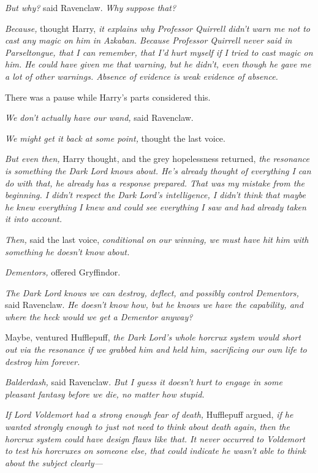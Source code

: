 \emph{But why?} said Ravenclaw. \emph{Why suppose that?}

\emph{Because,} thought Harry, \emph{it explains why Professor Quirrell didn’t \emph{warn me} not to cast any magic on him in Azkaban. Because Professor Quirrell never said in Parseltongue, that I can remember, that I’d hurt myself if I tried to cast magic on him. He could have given me that warning, but he didn’t, even though he gave me a lot of other warnings. Absence of evidence is weak evidence of absence.}

There was a pause while Harry’s parts considered this.

\emph{We don’t actually have our wand,} said Ravenclaw.

\emph{We might get it back at some point,} thought the last voice.

\emph{But even then,} Harry thought, and the grey hopelessness returned, \emph{the resonance is something the Dark Lord knows about. He’s already thought of everything I can do with that, he already has a response prepared. That was my mistake from the beginning. I didn’t respect the Dark Lord’s intelligence, I didn’t think that maybe he knew everything I knew and could see everything I saw and had already taken it into account.}

\emph{Then,} said the last voice, \emph{conditional on our winning, we must have hit him with something he doesn’t know about.}

\emph{Dementors,} offered Gryffindor.

\emph{The Dark Lord \emph{knows} we can destroy, deflect, and possibly control Dementors,} said Ravenclaw. \emph{He doesn’t know how, but he knows we have the capability, and where the heck would we get a Dementor anyway?}

Maybe, ventured Hufflepuff, \emph{the Dark Lord’s whole horcrux system would short out via the resonance if we grabbed him and held him, sacrificing our own life to destroy him forever.}

\emph{Balderdash,} said Ravenclaw. \emph{But I guess it doesn’t hurt to engage in some pleasant fantasy before we die, no matter how stupid.}

\emph{If Lord Voldemort had a strong enough fear of death,} Hufflepuff argued, \emph{if he wanted strongly enough to just not need to think about death again, then the horcrux system \emph{could} have design flaws like that. It never occurred to Voldemort to test his horcruxes on someone else, that could indicate he wasn’t able to think about the subject clearly—}

